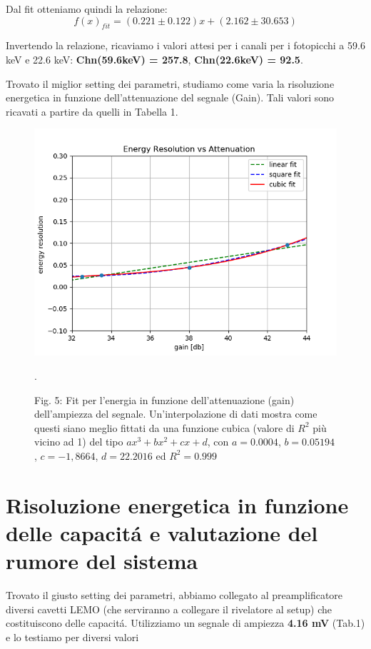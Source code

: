 \documentclass[a4paper]{article}
\begin{document}
Dal fit otteniamo quindi la relazione:
\begin{equation}
f(x)_{fit}=(0.221 \pm 0.122)x + (2.162 \pm 30.653)
\end{equation}

Invertendo la relazione, ricaviamo i valori attesi per i canali per i fotopicchi a 59.6 keV e 22.6 keV: \textbf{Chn(59.6keV) = 257.8}, \textbf{Chn(22.6keV) = 92.5}.
\newpage

Trovato il miglior setting dei parametri, studiamo come varia la risoluzione energetica in funzione dell'attenuazione del segnale (Gain). Tali valori sono ricavati a partire da quelli in Tabella 1. 

\begin{figure}[H]
\includegraphics[width=1\textwidth]{resvsgain}
        \caption{Fig. 5: Fit per l'energia in funzione dell'attenuazione (gain) dell'ampiezza del segnale. Un'interpolazione di dati mostra come questi siano meglio fittati da una funzione cubica (valore di $R^2$ più vicino ad 1) del tipo $ax^3+bx^2+cx+d$, con $a=0.0004 $, $b=0.05194 $, $c=-1,8664 $, $d=22.2016 $ ed $R^2=0.999$}.
        \label{fig:5}
\end{figure}

\newpage

\section{Risoluzione energetica in funzione delle capacit\'a e valutazione del rumore del sistema}

Trovato il giusto setting dei parametri, abbiamo collegato al preamplificatore diversi cavetti LEMO (che serviranno a collegare il rivelatore al setup) che costituiscono delle capacit\'a. Utilizziamo un segnale di ampiezza \textbf{4.16 mV} (Tab.1) e lo testiamo per diversi valori 
\end{document}
